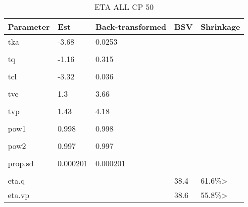 \begin{table}
\centering\centering
\caption{ETA ALL CP 50}
\centering
\fontsize{8}{10}\selectfont
\begin{tabular}[t]{lllll}
\toprule
\textbf{Parameter} & \textbf{Est} & \textbf{Back-transformed} & \textbf{BSV} & \textbf{Shrinkage}\\
\midrule
tka & -3.68 & 0.0253 &  & \\
\midrule\\
tq & -1.16 & 0.315 &  & \\
\midrule\\
tcl & -3.32 & 0.036 &  & \\
\midrule\\
tvc & 1.3 & 3.66 &  & \\
\midrule\\
tvp & 1.43 & 4.18 &  & \\
\midrule\\
pow1 & 0.998 & 0.998 &  & \\
\midrule\\
pow2 & 0.997 & 0.997 &  & \\
\midrule\\
prop.sd & 0.000201 & 0.000201 &  & \\
\midrule\\
eta.q &  &  & 38.4 & 61.6\%>\\
\midrule
eta.vp &  &  & 38.6 & 55.8\%>\\
\bottomrule
\end{tabular}
\end{table}